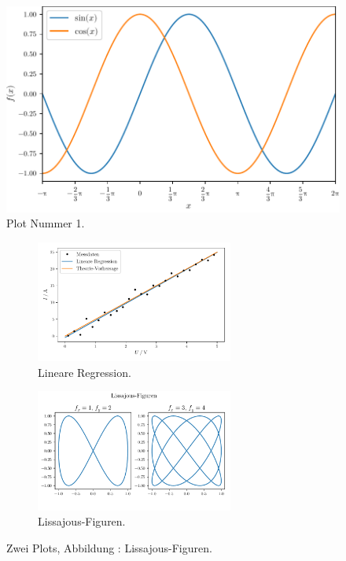 \documentclass{scrartcl} %
\begin{document}
    \begin{figure}
        \centering
        \includegraphics[width=\textwidth]{plot1.pdf}
        \caption{Plot Nummer 1.}
        \label{fig:plot1}
    \end{figure}
    \begin{figure}
        \centering
        \begin{subfigure}{0.48\textwidth}
            \centering
            \includegraphics[height=4cm]{plot2.pdf}
            \caption{Lineare Regression.}
            \label{fig:linreg}
        \end{subfigure}
        \begin{subfigure}{0.48\textwidth}
            \centering
            \includegraphics[height=4cm]{plot3.pdf}
            \caption{Lissajous-Figuren.}
            \label{fig:Liss}
        \end{subfigure}
        \caption{Zwei Plots, Abbildung : Lissajous-Figuren.}
        \label{fig:logos}
    \end{figure}
\end{document}
